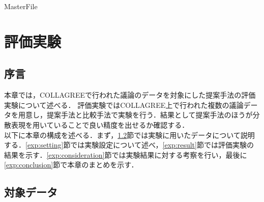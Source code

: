 \expandafter\ifx\csname MasterFile\endcsname\relax
\def\SubFile{hoge}


\setcounter{chapter}{4}
\fi
\cleardoublepage
\chapter{評価実験}
\label{exp:chapter}

\section{序言}
\label{exp:introduction}
本章では，COLLAGREEで行われた議論のデータを対象にした提案手法の評価実験について述べる．
評価実験ではCOLLAGREE上で行われた複数の議論データを用意し，提案手法と比較手法で実験を行う．結果として提案手法のほうが分散表現を用いていることで良い精度を出せるか確認する．\\
以下に本章の構成を述べる．まず，\ref{exp:data}節では実験に用いたデータについて説明する．\ref{exp:setting}節では実験設定について述べ，\ref{exp:result}節では評価実験の結果を示す．\ref{exp:consideration}節では実験結果に対する考察を行い，最後に\ref{exp:conclusion}節で本章のまとめを示す．

\clearpage
\section{対象データ}
\label{exp:data}
